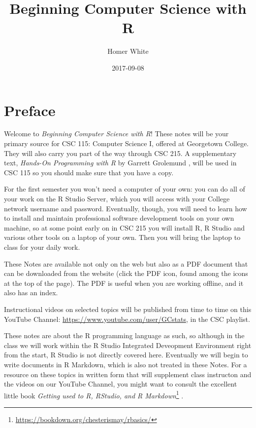 \documentclass[]{book}
\title{Beginning Computer Science with R}
\author{Homer White}
\date{2017-09-08}
\let\rmarkdownfootnote\footnote%
\def\footnote{\protect\rmarkdownfootnote}
\renewcommand{\href}[2]{#2\footnote{\url{#1}}}
\renewcommand{\href}[2]{#2\footnote{\url{#1}}}
\theoremstyle{definition}
\theoremstyle{definition}
\theoremstyle{definition}
\theoremstyle{remark}
\begin{document}
\maketitle

{
\setcounter{tocdepth}{1}
\tableofcontents
}
\chapter*{Preface}\label{preface}

Welcome to \emph{Beginning Computer Science with R}! These notes will be
your primary source for CSC 115: Computer Science I, offered at
Georgetown College. They will also carry you part of the way through CSC
215. A supplementary text, \emph{Hands-On Programming with R} by Garrett
Grolemund \citep{Grolemund2014}, will be used in CSC 115 so you should
make sure that you have a copy.

For the first semester you won't need a computer of your own: you can do
all of your work on the R Studio Server, which you will access with your
College network username and password. Eventually, though, you will need
to learn how to install and maintain professional software development
tools on your own machine, so at some point early on in CSC 215 you will
install R, R Studio and various other tools on a laptop of your own.
Then you will bring the laptop to class for your daily work.

These Notes are available not only on the web but also as a PDF document
that can be downloaded from the website (click the PDF icon, found among
the icons at the top of the page). The PDF is useful when you are
working offline, and it also has an index.

Instructional videos on selected topics will be published from time to
time on this YouTube Channel:
\url{https://www.youtube.com/user/GCstats}, in the CSC playlist.

These notes are about the R programming language as such, so although in
the class we will work within the R Studio Integrated Deveopment
Environment right from the start, R Studio is not directly covered here.
Eventually we will begin to write documents in R Markdown, which is also
not treated in these Notes. For a resource on these topics in written
form that will supplement class instructon and the videos on our YouTube
Channel, you might want to consult the excellent little book
\href{https://bookdown.org/chesterismay/rbasics/}{\emph{Getting used to
R, RStudio, and R Markdown}} \citep{Ismay2016}.
\end{document}
